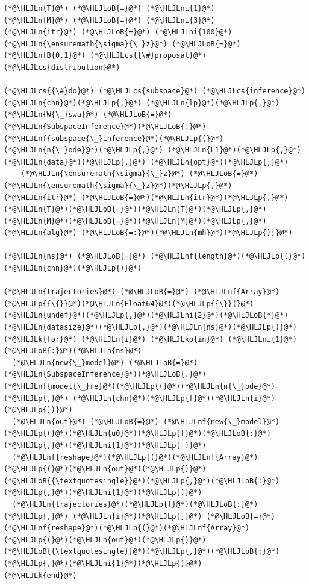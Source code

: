 \documentclass[12pt,a4paper]{article}
\newcommand{\HLJLk}[1]{\textcolor[RGB]{148,91,176}{\textbf{#1}}}
\newcommand{\HLJLkp}[1]{\textcolor[RGB]{148,91,176}{\textbf{#1}}}
\newcommand{\HLJLn}[1]{#1}
\newcommand{\HLJLnf}[1]{\textcolor[RGB]{66,102,213}{#1}}
\newcommand{\HLJLnfB}[1]{\textcolor[RGB]{59,151,46}{#1}}
\newcommand{\HLJLni}[1]{\textcolor[RGB]{59,151,46}{#1}}
\newcommand{\HLJLoB}[1]{\textcolor[RGB]{102,102,102}{\textbf{#1}}}
\newcommand{\HLJLp}[1]{#1}
\newcommand{\HLJLcs}[1]{\textcolor[RGB]{153,153,119}{\textit{#1}}}
\begin{document}
\begin{lstlisting}
(*@\HLJLn{T}@*) (*@\HLJLoB{=}@*) (*@\HLJLni{1}@*)
(*@\HLJLn{M}@*) (*@\HLJLoB{=}@*) (*@\HLJLni{3}@*)
(*@\HLJLn{itr}@*) (*@\HLJLoB{=}@*) (*@\HLJLni{100}@*)
(*@\HLJLn{\ensuremath{\sigma}{\_}z}@*) (*@\HLJLoB{=}@*) (*@\HLJLnfB{0.1}@*) (*@\HLJLcs{{\#}proposal}@*) (*@\HLJLcs{distribution}@*)

(*@\HLJLcs{{\#}do}@*) (*@\HLJLcs{subspace}@*) (*@\HLJLcs{inference}@*)
(*@\HLJLn{chn}@*)(*@\HLJLp{,}@*) (*@\HLJLn{lp}@*)(*@\HLJLp{,}@*) (*@\HLJLn{W{\_}swa}@*) (*@\HLJLoB{=}@*) (*@\HLJLn{SubspaceInference}@*)(*@\HLJLoB{.}@*)(*@\HLJLnf{subspace{\_}inference}@*)(*@\HLJLp{(}@*)(*@\HLJLn{n{\_}ode}@*)(*@\HLJLp{,}@*) (*@\HLJLn{L1}@*)(*@\HLJLp{,}@*) (*@\HLJLn{data}@*)(*@\HLJLp{,}@*) (*@\HLJLn{opt}@*)(*@\HLJLp{;}@*)
	(*@\HLJLn{\ensuremath{\sigma}{\_}z}@*) (*@\HLJLoB{=}@*) (*@\HLJLn{\ensuremath{\sigma}{\_}z}@*)(*@\HLJLp{,}@*) (*@\HLJLn{itr}@*) (*@\HLJLoB{=}@*)(*@\HLJLn{itr}@*)(*@\HLJLp{,}@*) (*@\HLJLn{T}@*)(*@\HLJLoB{=}@*)(*@\HLJLn{T}@*)(*@\HLJLp{,}@*) (*@\HLJLn{M}@*)(*@\HLJLoB{=}@*)(*@\HLJLn{M}@*)(*@\HLJLp{,}@*)  (*@\HLJLn{alg}@*) (*@\HLJLoB{=:}@*)(*@\HLJLn{mh}@*)(*@\HLJLp{);}@*)

(*@\HLJLn{ns}@*) (*@\HLJLoB{=}@*) (*@\HLJLnf{length}@*)(*@\HLJLp{(}@*)(*@\HLJLn{chn}@*)(*@\HLJLp{)}@*)

(*@\HLJLn{trajectories}@*) (*@\HLJLoB{=}@*) (*@\HLJLnf{Array}@*)(*@\HLJLp{{\{}}@*)(*@\HLJLn{Float64}@*)(*@\HLJLp{{\}}(}@*)(*@\HLJLn{undef}@*)(*@\HLJLp{,}@*)(*@\HLJLni{2}@*)(*@\HLJLoB{*}@*)(*@\HLJLn{datasize}@*)(*@\HLJLp{,}@*)(*@\HLJLn{ns}@*)(*@\HLJLp{)}@*)
(*@\HLJLk{for}@*) (*@\HLJLn{i}@*) (*@\HLJLkp{in}@*) (*@\HLJLni{1}@*)(*@\HLJLoB{:}@*)(*@\HLJLn{ns}@*)
  (*@\HLJLn{new{\_}model}@*) (*@\HLJLoB{=}@*) (*@\HLJLn{SubspaceInference}@*)(*@\HLJLoB{.}@*)(*@\HLJLnf{model{\_}re}@*)(*@\HLJLp{(}@*)(*@\HLJLn{n{\_}ode}@*)(*@\HLJLp{,}@*) (*@\HLJLn{chn}@*)(*@\HLJLp{[}@*)(*@\HLJLn{i}@*)(*@\HLJLp{])}@*)
  (*@\HLJLn{out}@*) (*@\HLJLoB{=}@*) (*@\HLJLnf{new{\_}model}@*)(*@\HLJLp{(}@*)(*@\HLJLn{u0}@*)(*@\HLJLp{[}@*)(*@\HLJLoB{:}@*)(*@\HLJLp{,}@*)(*@\HLJLni{1}@*)(*@\HLJLp{])}@*)
  (*@\HLJLnf{reshape}@*)(*@\HLJLp{(}@*)(*@\HLJLnf{Array}@*)(*@\HLJLp{(}@*)(*@\HLJLn{out}@*)(*@\HLJLp{)}@*)(*@\HLJLoB{{\textquotesingle}}@*)(*@\HLJLp{,}@*)(*@\HLJLoB{:}@*)(*@\HLJLp{,}@*)(*@\HLJLni{1}@*)(*@\HLJLp{)}@*)
  (*@\HLJLn{trajectories}@*)(*@\HLJLp{[}@*)(*@\HLJLoB{:}@*)(*@\HLJLp{,}@*) (*@\HLJLn{i}@*)(*@\HLJLp{]}@*) (*@\HLJLoB{=}@*) (*@\HLJLnf{reshape}@*)(*@\HLJLp{(}@*)(*@\HLJLnf{Array}@*)(*@\HLJLp{(}@*)(*@\HLJLn{out}@*)(*@\HLJLp{)}@*)(*@\HLJLoB{{\textquotesingle}}@*)(*@\HLJLp{,}@*)(*@\HLJLoB{:}@*)(*@\HLJLp{,}@*)(*@\HLJLni{1}@*)(*@\HLJLp{)}@*)
(*@\HLJLk{end}@*)


\end{lstlisting}
\end{document}
